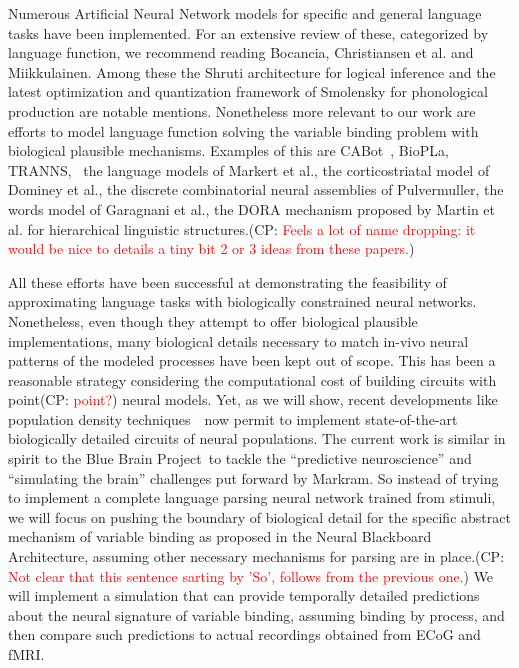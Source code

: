 \documentclass[10pt]{article}
\newcommand{\noteCP}[1]{(CP: \textcolor{red}{#1})}
\begin{document}
Numerous Artificial Neural Network models for specific and general
language tasks have been implemented. For an extensive review of
these, categorized by language function, we recommend reading
Bocancia\cite{bocancia2014psycholinguistically}, Christiansen et
al.\cite{Christiansen_1999} and
Miikkulainen\cite{miikkulainen1997natural}. Among these the Shruti
architecture for logical inference\cite{Wendelken_2004} and the latest
optimization and quantization framework of Smolensky for phonological
production\cite{Smolensky_2013} are notable mentions. Nonetheless more
relevant to our work are efforts to model language function solving
the variable binding problem with biological plausible mechanisms.
Examples of this are CABot~\cite{Huyck_2009},
BioPLa\cite{Garcia_Rosa},
TRANNS\cite{bocancia2014psycholinguistically}, ~the language models of
Markert et al.\cite{Markert_2007}, the corticostriatal model of
Dominey et al.\cite{Dominey_2009}, the discrete combinatorial neural
assemblies of Pulvermuller\cite{Pulverm_ller_2009,Pulverm_ller_2010},
the words model of Garagnani et al.\cite{Garagnani_2017}, the DORA
mechanism proposed by Martin et al. for hierarchical linguistic
structures\cite{Martin_2017}.\noteCP{Feels a lot of name dropping: it
  would be nice to details a tiny bit 2 or 3 ideas from these papers.}

All these efforts have been successful at demonstrating the
feasibility of approximating language tasks with biologically
constrained neural networks. Nonetheless, even though they attempt to
offer biological plausible implementations, many biological details
necessary to match in-vivo neural patterns of the modeled processes
have been kept out of scope. This has been a reasonable strategy
considering the computational cost of building circuits with
point\noteCP{point?} neural models. Yet, as we will show, recent
developments like population density
techniques~\cite{de2013generica}~now permit to implement
state-of-the-art biologically detailed circuits of neural populations.
The current work is similar in spirit to the Blue Brain
Project\cite{Markram_2006}~to tackle the ``predictive neuroscience''
and ``simulating the brain'' challenges put forward by
Markram\cite{markram2013seven}. So instead of trying to implement a
complete language parsing neural network trained from stimuli, we will
focus on pushing the boundary of biological detail for the specific
abstract mechanism of variable binding as proposed in the Neural
Blackboard Architecture\cite{van_der_Velde_2006}, assuming other
necessary mechanisms for parsing are in place.\noteCP{Not clear that
  this sentence sarting by 'So', follows from the previous one.} We
will implement a simulation that can provide temporally detailed
predictions about the neural signature of variable binding, assuming
binding by process, and then compare such predictions to actual
recordings obtained from ECoG and fMRI.
\end{document}
